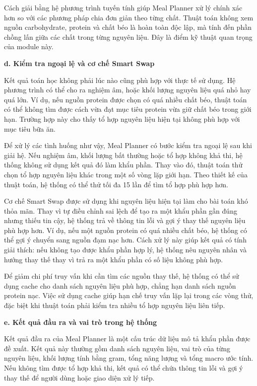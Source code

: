 \documentclass[12pt, a4paper]{report}
\begin{document}
Cách giải bằng hệ phương trình tuyến tính giúp Meal Planner xử lý chính xác hơn so với các phương pháp chia đơn giản theo từng chất. Thuật toán không xem nguồn carbohydrate, protein và chất béo là hoàn toàn độc lập, mà tính đến phần chồng lấn giữa các chất trong từng nguyên liệu. Đây là điểm kỹ thuật quan trọng của module này.

\textbf{d. Kiểm tra ngoại lệ và cơ chế Smart Swap}

Kết quả toán học không phải lúc nào cũng phù hợp với thực tế sử dụng. Hệ phương trình có thể cho ra nghiệm âm, hoặc khối lượng nguyên liệu quá nhỏ hay quá lớn. Ví dụ, nếu nguồn protein được chọn có quá nhiều chất béo, thuật toán có thể không tìm được cách vừa đạt mục tiêu protein vừa giữ chất béo trong giới hạn. Trường hợp này cho thấy tổ hợp nguyên liệu hiện tại không phù hợp với mục tiêu bữa ăn.

Để xử lý các tình huống như vậy, Meal Planner có bước kiểm tra ngoại lệ sau khi giải hệ. Nếu nghiệm âm, khối lượng bất thường hoặc tổ hợp không khả thi, hệ thống không sử dụng kết quả đó làm khẩu phần. Thay vào đó, thuật toán thử chọn tổ hợp nguyên liệu khác trong một số vòng lặp giới hạn. Theo thiết kế của thuật toán, hệ thống có thể thử tối đa 15 lần để tìm tổ hợp phù hợp hơn.

Cơ chế Smart Swap được sử dụng khi nguyên liệu hiện tại làm cho bài toán khó thỏa mãn. Thay vì tự điều chỉnh sai lệch để tạo ra một khẩu phần gần đúng nhưng thiếu tin cậy, hệ thống trả về thông tin lỗi và gợi ý thay thế nguyên liệu phù hợp hơn. Ví dụ, nếu một nguồn protein có quá nhiều chất béo, hệ thống có thể gợi ý chuyển sang nguồn đạm nạc hơn. Cách xử lý này giúp kết quả có tính giải thích: nếu không tạo được khẩu phần hợp lý, hệ thống nêu nguyên nhân và hướng thay thế thay vì trả ra một khẩu phần có số liệu không phù hợp.

Để giảm chi phí truy vấn khi cần tìm các nguồn thay thế, hệ thống có thể sử dụng cache cho danh sách nguyên liệu phù hợp, chẳng hạn danh sách nguồn protein nạc. Việc sử dụng cache giúp hạn chế truy vấn lặp lại trong các vòng thử, đặc biệt khi thuật toán phải kiểm tra nhiều tổ hợp nguyên liệu liên tiếp.

\textbf{e. Kết quả đầu ra và vai trò trong hệ thống}

Kết quả đầu ra của Meal Planner là một cấu trúc dữ liệu mô tả khẩu phần được đề xuất. Kết quả này thường gồm danh sách nguyên liệu, vai trò của từng nguyên liệu, khối lượng tính bằng gram, tổng năng lượng và tổng macro ước tính. Nếu không tìm được tổ hợp khả thi, kết quả có thể chứa thông tin lỗi và gợi ý thay thế để người dùng hoặc giao diện xử lý tiếp.
\end{document}
